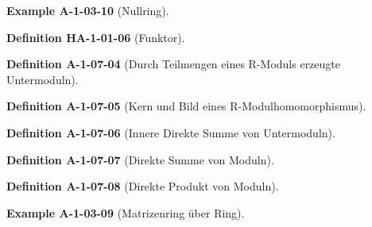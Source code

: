\documentclass[10pt, letterpaper]{article}
\newcommand{\CustomHeading}[3]{%
  \par\medskip\noindent%
  \textbf{#1 #2} \textnormal{(#3)}.\enskip%
}
\newenvironment{DEF}[2]{\CustomHeading{Definition}{#1}{#2}}{}
\newenvironment{EXA}[2]{\CustomHeading{Example}{#1}{#2}}{}
\begin{document}

\begin{EXA}{A-1-03-10}{Nullring}
\end{EXA}


\begin{DEF}{HA-1-01-06}{Funktor}
\end{DEF}


\begin{DEF}{A-1-07-04}{Durch Teilmengen eines R-Moduls erzeugte Untermoduln}
\end{DEF}


\begin{DEF}{A-1-07-05}{Kern und Bild eines R-Modulhomomorphismus}
\end{DEF}


\begin{DEF}{A-1-07-06}{Innere Direkte Summe von Untermoduln}
\end{DEF}


\begin{DEF}{A-1-07-07}{Direkte Summe von Moduln}
\end{DEF}


\begin{DEF}{A-1-07-08}{Direkte Produkt von Moduln}
\end{DEF}


\begin{EXA}{A-1-03-09}{Matrizenring über Ring}
\end{EXA}
\end{document}
